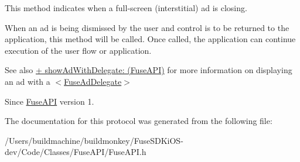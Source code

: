 This method indicates when a full-\/screen (interstitial) ad is closing. 

When an ad is being dismissed by the user and control is to be returned to the application, this method will be called. Once called, the application can continue execution of the user flow or application. \begin{DoxySeeAlso}{See also}
\hyperlink{interface_fuse_a_p_i_ada82ae54afd63865982e516d4a71a8b5}{+ show\+Ad\+With\+Delegate\+: (\+Fuse\+A\+P\+I)} for more information on displaying an ad with a $<$\hyperlink{protocol_fuse_ad_delegate-p}{Fuse\+Ad\+Delegate}$>$ 
\end{DoxySeeAlso}
\begin{DoxySince}{Since}
\hyperlink{interface_fuse_a_p_i}{Fuse\+A\+P\+I} version 1. 
\end{DoxySince}


The documentation for this protocol was generated from the following file\+:\begin{DoxyCompactItemize}
\item 
/\+Users/buildmachine/buildmonkey/\+Fuse\+S\+D\+Ki\+O\+S-\/dev/\+Code/\+Classes/\+Fuse\+A\+P\+I/Fuse\+A\+P\+I.\+h\end{DoxyCompactItemize}
